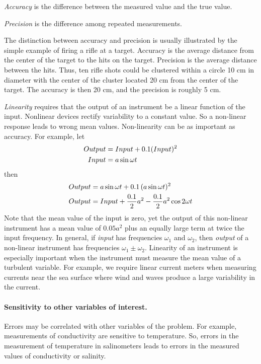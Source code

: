 \textit{Accuracy} is the difference between the
measured value and the true value.

\textit{Precision} is the difference among
repeated measurements.

The distinction between accuracy and precision is usually illustrated
by the simple example of firing a rifle at a target. Accuracy is the
average distance from the center of the target to the hits on the
target. Precision is the average distance between the hits. Thus, ten
rifle shots could be clustered within a circle 10 cm in diameter with
the center of the cluster located 20 cm from the center of the
target. The accuracy is then 20 cm, and the precision is roughly 5 cm.

\textit{Linearity} requires that the output of
an instrument be a linear function of the input. Nonlinear devices
rectify variability to a constant value. So a non-linear response
leads to wrong mean values. Non-linearity can be as important as
accuracy.  For example, let
\begin{align}
Output &= Input + 0.1(Input)^2 \notag \\
Input &= a \sin \omega t \notag
\end{align}
then
\begin{align}
Output &= a \sin \omega t + 0.1\,(a \sin \omega t)^2 \notag \\
Output &= Input + \frac{0.1}{2} a^2 - \frac{0.1}{2} a^2 \cos 2\omega t
\notag
\end{align}
Note that the mean value of the input is zero, yet the output of this
non-linear instrument has a mean value of \(0.05 a^2\) plus an equally
large term at twice the input frequency. In general, if \textit{input}
has frequencies \(\omega_1\) and \(\omega_2\), then \textit{output} of
a non-linear instrument has frequencies \(\omega_1 \pm \omega_2\).
Linearity of an instrument is especially important when
the instrument must measure the mean value of a turbulent
variable. For example, we require linear current meters when measuring
currents near the sea surface where wind and waves produce a large
variability in the current.

\paragraph{Sensitivity to other variables of interest.}
Errors may be correlated with other variables of the problem. For
example, measurements of conductivity are sensitive to
temperature. So, errors in the measurement of temperature in
salinometers leads to errors in the measured values of conductivity or
salinity.

